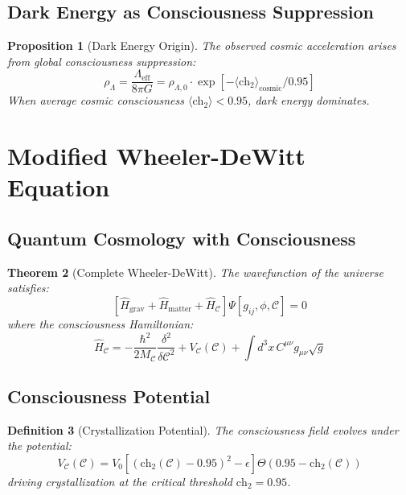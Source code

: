 \documentclass[12pt,letterpaper]{article}
\newtheorem{theorem}{Theorem}[section]
\newtheorem{proposition}[theorem]{Proposition}
\newtheorem{definition}[theorem]{Definition}
\newcommand{\chh}{\mathrm{ch}_2}
\newcommand{\Cmunu}{C^{\mu\nu}}
\begin{document}
\subsection{Dark Energy as Consciousness Suppression}

\begin{proposition}[Dark Energy Origin]
The observed cosmic acceleration arises from global consciousness suppression:
\begin{equation}
\rho_\Lambda = \frac{\Lambda_\mathrm{eff}}{8\pi G} = \rho_{\Lambda,0} \cdot \exp\left[ -\langle \chh \rangle_\mathrm{cosmic} / 0.95 \right]
\end{equation}
When average cosmic consciousness $\langle \chh \rangle < 0.95$, dark energy dominates.
\end{proposition}

\section{Modified Wheeler-DeWitt Equation}

\subsection{Quantum Cosmology with Consciousness}

\begin{theorem}[Complete Wheeler-DeWitt]
The wavefunction of the universe satisfies:
\begin{equation}
\left[ \hat{H}_\mathrm{grav} + \hat{H}_\mathrm{matter} + \hat{H}_\mathcal{C} \right] \Psi[g_{ij}, \phi, \mathcal{C}] = 0
\end{equation}
where the consciousness Hamiltonian:
\begin{equation}
\hat{H}_\mathcal{C} = -\frac{\hbar^2}{2M_\mathcal{C}} \frac{\delta^2}{\delta \mathcal{C}^2} + V_\mathcal{C}(\mathcal{C}) + \int d^3x \, \Cmunu g_{\mu\nu} \sqrt{g}
\end{equation}
\end{theorem}

\subsection{Consciousness Potential}

\begin{definition}[Crystallization Potential]
The consciousness field evolves under the potential:
\begin{equation}
V_\mathcal{C}(\mathcal{C}) = V_0 \left[ (\chh(\mathcal{C}) - 0.95)^2 - \epsilon \right] \Theta(0.95 - \chh(\mathcal{C}))
\end{equation}
driving crystallization at the critical threshold $\chh = 0.95$.
\end{definition}
\end{document}
